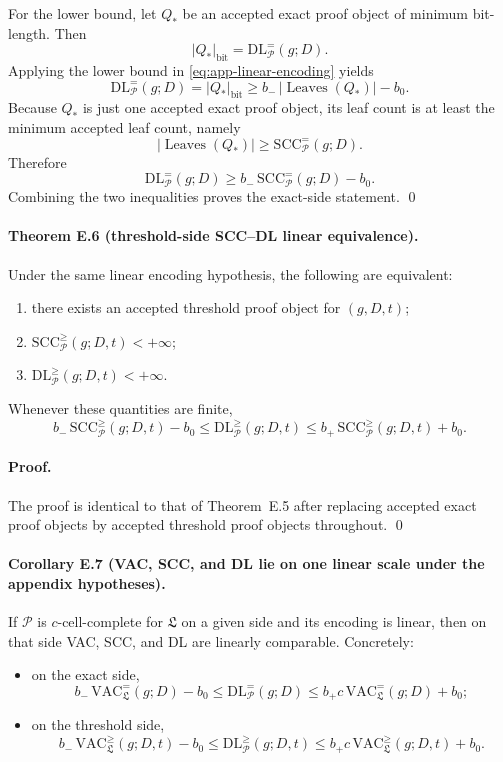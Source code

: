 For the lower bound, let $Q_\ast$ be an accepted exact proof object of minimum bit-length. Then
\[
|Q_\ast|_{\mathrm{bit}}=\mathrm{DL}^{=}_{\mathcal P}(g;D).
\]
Applying the lower bound in \eqref{eq:app-linear-encoding} yields
\[
\mathrm{DL}^{=}_{\mathcal P}(g;D)
=
|Q_\ast|_{\mathrm{bit}}
\ge
b_-\,|\operatorname{Leaves}(Q_\ast)|-b_0.
\]
Because $Q_\ast$ is just one accepted exact proof object, its leaf count is at least the minimum accepted leaf count, namely
\[
|\operatorname{Leaves}(Q_\ast)|
\ge
\mathrm{SCC}^{=}_{\mathcal P}(g;D).
\]
Therefore
\[
\mathrm{DL}^{=}_{\mathcal P}(g;D)
\ge
b_-\,\mathrm{SCC}^{=}_{\mathcal P}(g;D)-b_0.
\]
Combining the two inequalities proves the exact-side statement. \qed

\paragraph{Theorem E.6 (threshold-side SCC--DL linear equivalence).}
Under the same linear encoding hypothesis, the following are equivalent:
\begin{enumerate}
    \item there exists an accepted threshold proof object for $(g,D,t)$;
    \item $\mathrm{SCC}^{\ge}_{\mathcal P}(g;D,t)<+\infty$;
    \item $\mathrm{DL}^{\ge}_{\mathcal P}(g;D,t)<+\infty$.
\end{enumerate}
Whenever these quantities are finite,
\[
 b_-\,\mathrm{SCC}^{\ge}_{\mathcal P}(g;D,t)-b_0
 \le
 \mathrm{DL}^{\ge}_{\mathcal P}(g;D,t)
 \le
 b_+\,\mathrm{SCC}^{\ge}_{\mathcal P}(g;D,t)+b_0.
\]

\paragraph{Proof.}
The proof is identical to that of Theorem~E.5 after replacing accepted exact proof objects by accepted threshold proof objects throughout. \qed

\paragraph{Corollary E.7 (VAC, SCC, and DL lie on one linear scale under the appendix hypotheses).}
If $\mathcal P$ is $c$-cell-complete for $\mathfrak L$ on a given side and its encoding is linear, then on that side VAC, SCC, and DL are linearly comparable. Concretely:
\begin{itemize}
    \item on the exact side,
    \[
     b_-\,\mathrm{VAC}^{=}_{\mathfrak L}(g;D)-b_0
     \le
     \mathrm{DL}^{=}_{\mathcal P}(g;D)
     \le
     b_+c\,\mathrm{VAC}^{=}_{\mathfrak L}(g;D)+b_0;
    \]
    \item on the threshold side,
    \[
     b_-\,\mathrm{VAC}^{\ge}_{\mathfrak L}(g;D,t)-b_0
     \le
     \mathrm{DL}^{\ge}_{\mathcal P}(g;D,t)
     \le
     b_+c\,\mathrm{VAC}^{\ge}_{\mathfrak L}(g;D,t)+b_0.
    \]
\end{itemize}


